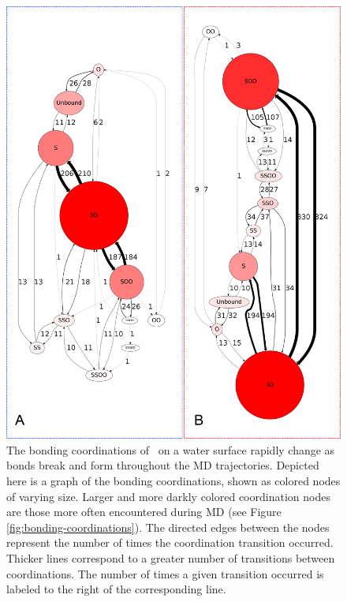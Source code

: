 \begin{figure}[h!]
	\begin{center}
		\includegraphics[scale=1.0]{images/coordinations/coordination-transitions.png}
		\caption{The bonding coordinations of \suldiox~on a water surface rapidly change as bonds break and form throughout the MD trajectories. Depicted here is a graph of the bonding coordinations, shown as colored nodes of varying size. Larger and more darkly colored coordination nodes are those more often encountered during MD (see Figure \ref{fig:bonding-coordinations}). The directed edges between the nodes represent the number of times the coordination transition occurred. Thicker lines correspond to a greater number of transitions between coordinations. The number of times a given transition occurred is labeled to the right of the corresponding line.}
		\label{fig:coordination-transitions}
	\end{center}
\end{figure}

